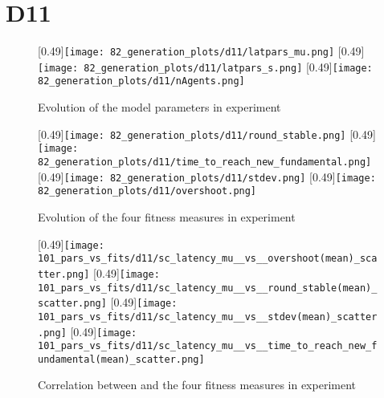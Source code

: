 \section{D11}\label{section:experiment_9}

\begin{figure}
	\centering
	[0.49\linewidth]{\texttt{[image: 82\_generation\_plots/d11/latpars\_mu.png]}}
	[0.49\linewidth]{\texttt{[image: 82\_generation\_plots/d11/latpars\_s.png]}}
	[0.49\linewidth]{\texttt{[image: 82\_generation\_plots/d11/nAgents.png]}}
	\caption{Evolution of the model parameters in experiment \deleven}
	\label{fig:d11_evolution_parameters}
\end{figure}

\begin{figure}
	\centering
	[0.49\linewidth]{\texttt{[image: 82\_generation\_plots/d11/round\_stable.png]}}
	[0.49\linewidth]{\texttt{[image: 82\_generation\_plots/d11/time\_to\_reach\_new\_fundamental.png]}}
	[0.49\linewidth]{\texttt{[image: 82\_generation\_plots/d11/stdev.png]}}
	[0.49\linewidth]{\texttt{[image: 82\_generation\_plots/d11/overshoot.png]}}
	\caption{Evolution of the four fitness measures in experiment \deleven}
	\label{fig:d11_evolution_fitness}
\end{figure}

\begin{figure}
	\centering
	[0.49\linewidth]{\texttt{[image: 101\_pars\_vs\_fits/d11/sc\_latency\_mu\_\_vs\_\_overshoot(mean)\_scatter.png]}}
	[0.49\linewidth]{\texttt{[image: 101\_pars\_vs\_fits/d11/sc\_latency\_mu\_\_vs\_\_round\_stable(mean)\_scatter.png]}}
	[0.49\linewidth]{\texttt{[image: 101\_pars\_vs\_fits/d11/sc\_latency\_mu\_\_vs\_\_stdev(mean)\_scatter.png]}}
	[0.49\linewidth]{\texttt{[image: 101\_pars\_vs\_fits/d11/sc\_latency\_mu\_\_vs\_\_time\_to\_reach\_new\_fundamental(mean)\_scatter.png]}}
	
	\caption{Correlation between \sclatencymu and the four fitness measures in experiment \deleven}
	\label{fig:d11_parvfit_sclatencymu}
\end{figure}

